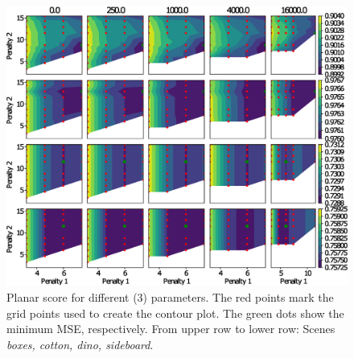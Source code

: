 \documentclass  [
  paper    = a4,
  BCOR     = 10mm,
  twoside,
  fontsize = 12pt,
  fleqn,
  toc      = bibnumbered,
  toc      = listofnumbered,
  numbers  = noendperiod,
  headings = normal,
  listof   = leveldown,
  version  = 3.03
]                                       {scrreprt}
\begin{document}
\begin{appendix}
\begin{figure}[h!]
  		\label{fig:sgmparamscontourdis}
  	\end{figure}
  	\begin{figure}[h!]
  		\centering
  		\includegraphics[width=1\linewidth]{images/sgm_params_contour_mae_planes}
  		\caption[Planar score for different (3) parameters]{Planar score for different (3) parameters. The red points mark the grid points used to create the contour plot. The green dots show the minimum MSE, respectively. From upper row to lower row: Scenes \textit{boxes, cotton, dino, sideboard}.}
  		\label{fig:sgmparamscontourdmae}
  	\end{figure}

\end{appendix}
\end{document}
